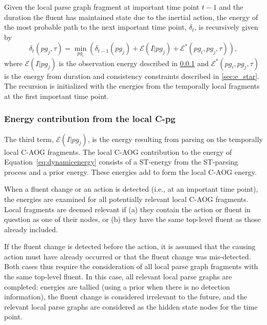 \documentclass[10pt,journal,letterpaper,compsoc]{IEEEtran}
\begin{document}
Given the local parse graph fragment at important time point $t-1$ and the duration the fluent has maintained state due to the inertial action, the energy of the most probable path to the next important time point, $\delta_t$, is recursively given by
%
\begin{equation}
\delta_t(pg_j, \tau) = \min_{pg_i} \left( \delta_{t-1}(pg_j) + \mathcal{E}(I | pg_j)+  \mathcal{E}^{*}(pg_i, pg_j, \tau )  \right), 
\end{equation}
where $\mathcal{E}(I | pg_j) $ is the observation energy described in \ref{sec:observation_energy} and $\mathcal{E}^{*}(pg_i, pg_j, \tau )$ is the energy from duration and consistency constraints described in \ref{sec:e_star}.  The recursion is initialized with the energies from the temporally local fragments at the first important time point.



\subsubsection{Energy contribution from the local C-pg}
\label{sec:observation_energy}

The third term, $\mathcal{E}(I | pg_j)$, is the energy resulting from parsing on the temporally local C-AOG fragments.  The local C-AOG contribution to the energy of Equation~\ref{eq:dynamicenergy} consists of a ST-energy from the ST-parsing process and a prior energy.  These energies add to form the local C-AOG energy.

When a fluent change or an action is detected (i.e., at an important time point), the energies are examined for all potentially relevant local C-AOG fragments.  Local fragments are deemed relevant if (a) they contain the action or fluent in question as one of their nodes, or (b) they have the same top-level fluent as those already included.  %

If the fluent change is detected before the action, it is assumed that the causing action must have already occurred or that the fluent change was mis-detected.  Both cases thus require the consideration of all local parse graph fragments with the same top-level fluent.  In this case, all relevant local parse graphs are completed:  energies are tallied (using a prior when there is no detection information), the fluent change is considered irrelevant to the future, and the relevant local parse graphs are considered as the hidden state nodes for the time point.  
\end{document}
